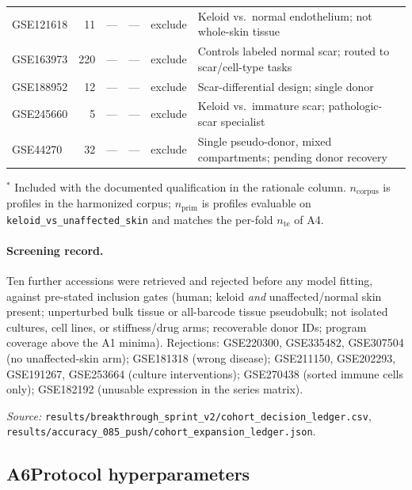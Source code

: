 {\begin{tabularx}{\textwidth}{@{}lrrrlX@{}}
GSE121618   & 11  & --- & --- & exclude & Keloid vs.\ normal endothelium; not whole-skin tissue \\
GSE163973   & 220 & --- & --- & exclude & Controls labeled normal scar; routed to scar/cell-type tasks \\
GSE188952   & 12  & --- & --- & exclude & Scar-differential design; single donor \\
GSE245660   & 5   & --- & --- & exclude & Keloid vs.\ immature scar; pathologic-scar specialist \\
GSE44270    & 32  & --- & --- & exclude & Single pseudo-donor, mixed compartments; pending donor recovery \\
\bottomrule
\end{tabularx}
}

\medskip
{\footnotesize
\noindent$^{*}$ Included with the documented qualification in the rationale
column. $n_{\text{corpus}}$ is profiles in the harmonized corpus;
$n_{\text{prim}}$ is profiles evaluable on
\texttt{keloid\_vs\_unaffected\_skin} and matches the per-fold $n_{\text{te}}$
of A4.
}

\paragraph{Screening record.} Ten further accessions were retrieved and
rejected before any model fitting, against pre-stated inclusion gates (human;
keloid \emph{and} unaffected/normal skin present; unperturbed bulk tissue or
all-barcode tissue pseudobulk; not isolated cultures, cell lines, or
stiffness/drug arms; recoverable donor IDs; program coverage above the A1
minima). Rejections: GSE220300, GSE335482, GSE307504 (no unaffected-skin arm);
GSE181318 (wrong disease); GSE211150, GSE202293, GSE191267, GSE253664 (culture
interventions); GSE270438 (sorted immune cells only); GSE182192 (unusable
expression in the series matrix).

\medskip
\noindent\textit{Source:}
\texttt{results/breakthrough\_sprint\_v2/cohort\_decision\_ledger.csv},
\texttt{results/accuracy\_085\_push/cohort\_expansion\_ledger.json}.

\subsection*{A6\quad Protocol hyperparameters}
\label{app:hyper}


